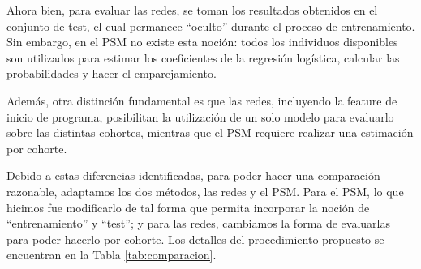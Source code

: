 \documentclass[../../main.tex]{subfiles}
\begin{document}
Ahora bien, para evaluar las redes, se toman los resultados obtenidos en el conjunto de
test, el cual permanece ``oculto'' durante el proceso de entrenamiento. Sin embargo, en el
PSM no existe esta noción: todos los individuos disponibles son utilizados para estimar
los coeficientes de la regresión logística, calcular las probabilidades y hacer el
emparejamiento.

Además, otra distinción fundamental es que las redes, incluyendo la feature de inicio de
programa, posibilitan la utilización de un solo modelo para evaluarlo sobre las distintas
cohortes, mientras que el PSM requiere realizar una estimación por cohorte.

Debido a estas diferencias identificadas, para poder hacer una comparación razonable,
adaptamos los dos métodos, las redes y el PSM. Para el PSM, lo que hicimos fue modificarlo
de tal forma que permita incorporar la noción de ``entrenamiento'' y ``test''; y para las
redes, cambiamos la forma de evaluarlas para poder hacerlo por cohorte. Los detalles del
procedimiento propuesto se encuentran en la Tabla \ref{tab:comparacion}.
\end{document}
